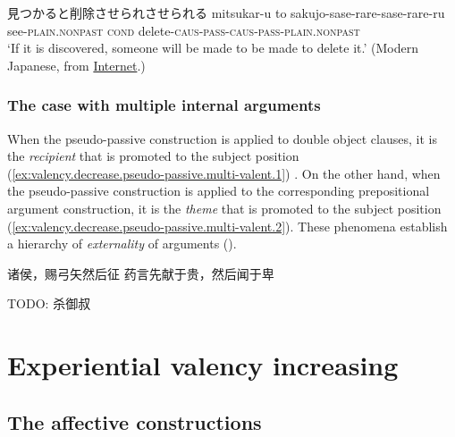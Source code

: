\documentclass[UTF8, a4paper, oneside, scheme=plain, 12pt]{ctexrep}
\newcommand*{\citepage}[1]{p.~{#1}}
\newcommand*{\term}[1]{\emph{#1}}
\newcommand{\translate}[1]{`#1'}
\newcommand*{\category}[1]{\textsc{#1}}
\begin{document}
\begin{exe}
    \ex\label{ex:valency.passive.pseudo-passive.alternate-caus.japanese} 見つかると削除させられさせられる
    \gll mitsukar-u to sakujo-sase-rare-sase-rare-ru \\
    see-\category{plain}.\category{nonpast} \category{cond} delete-\category{caus}-\category{pass}-\category{caus}-\category{pass}-\category{plain}.\category{nonpast} \\
    \glt\translate{If it is discovered, someone will be made to be made to delete it.} (Modern Japanese, from \href{https://kuroisi.com/blog/2253.html}{Internet}.)
\end{exe}

\subsubsection{The case with multiple internal arguments}\label{sec:grammatical.clause.verbal.argument-structure.pseudo-passive.multiple-argument}

When the pseudo-passive construction is applied to double object clauses,
it is the \emph{recipient} that is promoted to the subject position 
(\ref{ex:valency.decrease.pseudo-passive.multi-valent.1}) \citep[\citepage{421}]{meiguang2018}.
On the other hand, when the pseudo-passive construction is applied to the corresponding prepositional argument construction,
it is the \emph{theme} that is promoted to the subject position
(\ref{ex:valency.decrease.pseudo-passive.multi-valent.2}).
These phenomena establish a hierarchy of \term{externality} of arguments ().

\begin{exe}
    \ex\label{ex:valency.decrease.pseudo-passive.multi-valent.1} 诸侯，赐弓矢然后征
    \ex\label{ex:valency.decrease.pseudo-passive.multi-valent.2} 药言先献于贵，然后闻于卑
\end{exe}

TODO: 杀御叔

\section{Experiential valency increasing}

\subsection{The affective constructions}
\end{document}
